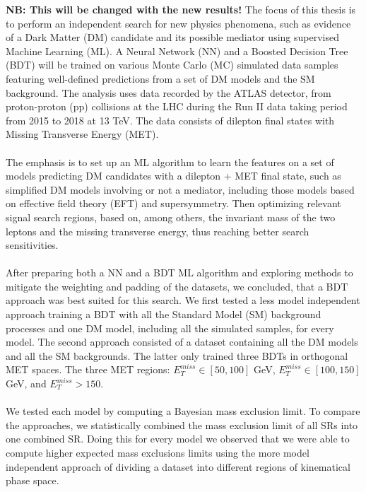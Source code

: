 \documentclass[12pt, a4paper]{book}
\begin{document}
\textbf{NB: This will be changed with the new results!}
The focus of this thesis is to perform an independent search for new physics phenomena, such as evidence of a Dark Matter (DM) candidate and its possible mediator using supervised Machine Learning (ML). A Neural Network (NN) and a Boosted Decision Tree (BDT) will 
be trained on various Monte Carlo (MC) simulated data samples featuring well-defined predictions from a set of DM models and the SM background. The analysis uses data recorded by the ATLAS detector, from proton-proton (pp) collisions at the LHC during the Run II data taking period from 2015 to 2018 at 13 TeV. 
The data consists of dilepton final states with Missing Transverse Energy (MET).\\
\\The emphasis is to set up an ML algorithm to learn the features on a set of models predicting DM candidates with a dilepton + MET final state, such as simplified DM models 
involving or not a mediator, including those models based on effective field theory (EFT) and supersymmetry. Then optimizing relevant signal search regions, based on, among others, the invariant mass of the two leptons and the missing transverse energy, 
thus reaching better search sensitivities.\\
\\After preparing both a NN and a BDT ML algorithm and exploring methods to mitigate the weighting and padding of the datasets, we concluded, that a BDT approach was best suited for this search. We first tested a less model independent approach training a BDT with all the Standard Model (SM) background processes and one DM model, 
including all the simulated samples, for every model. The second approach consisted of a dataset containing all the DM models and all the SM backgrounds. The latter only trained three BDTs in orthogonal MET spaces. The three MET regions: $E_T^{miss}\in[50,100]$ GeV,
$E_T^{miss}\in[100,150]$ GeV, and $E_T^{miss}>150$.\\
\\We tested each model by computing a Bayesian mass exclusion limit. To compare the approaches, we statistically combined the mass exclusion limit of all SRs into one combined SR. Doing this for every model we observed that we were able 
to compute higher expected mass exclusions limits using the more model independent approach of dividing a dataset into different regions of kinematical phase space. 
\end{document}

